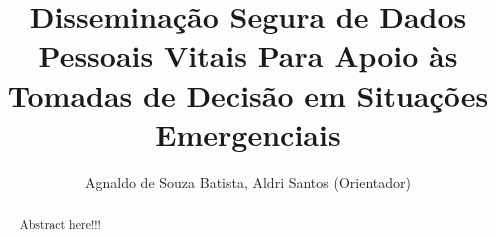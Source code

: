 \documentclass[12pt]{article}
\title{Disseminação Segura de Dados Pessoais Vitais Para Apoio às Tomadas de Decisão em Situações Emergenciais}
\author{Agnaldo de Souza Batista\inst{1}, Aldri Santos\inst{1} (Orientador)}
\begin{document}
 
\pagestyle{myheadings} %
\maketitle

\begin{abstract}
Abstract here!!!

\end{abstract}
\end{document}
